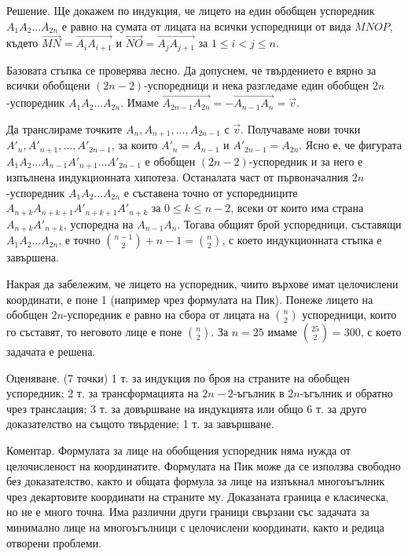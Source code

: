 Решение. Ще докажем по индукция, че лицето на един обобщен успоредник $A_1A_2\ldots A_{2n}$ е равно на сумата от лицата на всички успоредници от вида $MNOP$, където $\overrightarrow{MN}=\overrightarrow{A_iA_{i+1}}$ и $\overrightarrow{NO}=\overrightarrow{A_jA_{j+1}}$ за $1\leq i<j\leq n$.

Базовата стъпка се проверява лесно. Да допуснем, че твърдението е вярно за всички обобщени $(2n-2)$-успоредници и нека разгледаме един обобщен $2n$-успоредник $A_1A_2\ldots A_{2n}$. Имаме $\overrightarrow{A_{2n-1}A_{2n}}=-\overrightarrow{A_{n-1}A_n}=\vec v$.

Да транслираме точките $A_n,A_{n+1},\ldots,A_{2n-1}$ с $\vec v$. Получаваме нови точки $A'_n,A'_{n+1},\ldots,A'_{2n-1}$, за които $A'_n=A_{n-1}$ и $A'_{2n-1}=A_{2n}$. Ясно е, че фигурата $A_1A_2\ldots A_{n-1}A'_{n+1}\ldots A'_{2n-1}$ е обобщен $(2n-2)$-успоредник и за него е изпълнена индукционната хипотеза. Останалата част от първоначалния $2n$-успоредник $A_1A_2\ldots A_{2n}$ е съставена точно от успоредниците $A_{n+k}A_{n+k+1}A'_{n+k+1}A'_{n+k}$ за $0\leq k\leq n-2$, всеки от които има страна $A_{n+k}A'_{n+k}$, успоредна на $A_{n-1}A_n$. Тогава общият брой успоредници, съставящи $A_1A_2\ldots A_{2n}$, е точно $\binom{n-1}{2}+n-1=\binom n2$, с което индукционната стъпка е завършена.

Накрая да забележим, че лицето на успоредник, чиито върхове имат целочислени координати, е поне 1 (например чрез формулата на Пик). Понеже лицето на обобщен $2n$-успоредник е равно на сбора от лицата на $\binom n2$ успоредници, които го съставят, то неговото лице е поне $\binom n2$. За $n=25$ имаме $\binom{25}{2}=300$, с което задачата е решена.

Оценяване. (7 точки) 1 т. за индукция по броя на страните на обобщен успоредник; 2 т. за трансформацията на $2n-2$-ъгълник в $2n$-ъгълник и обратно чрез транслация; 3 т. за довършване на индукцията или общо 6 т. за друго доказателство на същото твърдение; 1 т. за завършване.

Коментар. Формулата за лице на обобщения успоредник няма нужда от целочисленост на координатите. Формулата на Пик може да се използва свободно без доказателство, както и общата формула за лице на изпъкнал многоъгълник чрез декартовите координати на страните му. Доказаната граница е класическа, но не е много точна. Има различни други граници свързани със задачата за минимално лице на многоъгълници с целочислени координати, както и редица отворени проблеми.
